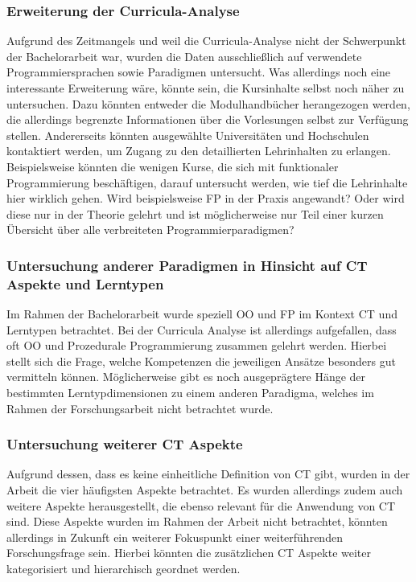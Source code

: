 \subsubsection{Erweiterung der Curricula-Analyse}
Aufgrund des Zeitmangels und weil die Curricula-Analyse nicht der Schwerpunkt der Bachelorarbeit war, wurden die Daten ausschließlich auf verwendete Programmiersprachen sowie Paradigmen untersucht. Was allerdings noch eine interessante Erweiterung wäre, könnte sein, die Kursinhalte selbst noch näher zu untersuchen. Dazu könnten entweder die Modulhandbücher herangezogen werden, die allerdings begrenzte Informationen über die Vorlesungen selbst zur Verfügung stellen. Andererseits könnten ausgewählte Universitäten und Hochschulen kontaktiert werden, um Zugang zu den detaillierten Lehrinhalten zu erlangen.
Beispielsweise könnten die wenigen Kurse, die sich mit funktionaler Programmierung beschäftigen, darauf untersucht werden, wie tief die Lehrinhalte hier wirklich gehen. Wird beispielsweise FP in der Praxis angewandt? Oder wird diese nur in der Theorie gelehrt und ist möglicherweise nur Teil einer kurzen Übersicht über alle verbreiteten Programmierparadigmen?

\subsubsection{Untersuchung anderer Paradigmen in Hinsicht auf CT Aspekte und Lerntypen}
Im Rahmen der Bachelorarbeit wurde speziell OO und FP im Kontext CT und Lerntypen betrachtet. Bei der Curricula Analyse ist allerdings aufgefallen, dass oft OO und Prozedurale Programmierung zusammen gelehrt werden. Hierbei stellt sich die Frage, welche Kompetenzen die jeweiligen Ansätze besonders gut vermitteln können.
Möglicherweise gibt es noch ausgeprägtere Hänge der bestimmten Lerntypdimensionen zu einem anderen Paradigma, welches im Rahmen der Forschungsarbeit nicht betrachtet wurde.

\subsubsection{Untersuchung weiterer CT Aspekte}
Aufgrund dessen, dass es keine einheitliche Definition von CT gibt, wurden in der Arbeit die vier häufigsten Aspekte betrachtet. Es wurden allerdings zudem auch weitere Aspekte herausgestellt, die ebenso relevant für die Anwendung von CT sind. Diese Aspekte wurden im Rahmen der Arbeit nicht betrachtet, könnten allerdings in Zukunft ein weiterer Fokuspunkt einer weiterführenden Forschungsfrage sein. Hierbei könnten die zusätzlichen CT Aspekte weiter kategorisiert und hierarchisch geordnet werden.

